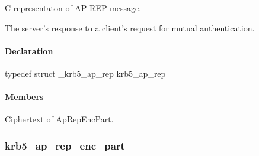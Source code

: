 \documentclass[letterpaper,10pt,english]{sphinxmanual}
\begin{document}
\begin{fulllineitems}
\label{appdev/refs/types/krb5_ap_rep:krb5_ap_rep}
\end{fulllineitems}


C representaton of AP-REP message.

The server's response to a client's request for mutual authentication.


\paragraph{Declaration}
\label{appdev/refs/types/krb5_ap_rep:declaration}
typedef struct \_krb5\_ap\_rep  krb5\_ap\_rep


\paragraph{Members}
\label{appdev/refs/types/krb5_ap_rep:members}

\begin{fulllineitems}
\label{appdev/refs/types/krb5_ap_rep:krb5_ap_rep.magic}
\end{fulllineitems}


\begin{fulllineitems}
\label{appdev/refs/types/krb5_ap_rep:krb5_ap_rep.enc_part}
Ciphertext of ApRepEncPart.

\end{fulllineitems}



\subsubsection{krb5\_ap\_rep\_enc\_part}
\label{appdev/refs/types/krb5_ap_rep_enc_part:krb5-ap-rep-enc-part-struct}\label{appdev/refs/types/krb5_ap_rep_enc_part::doc}\label{appdev/refs/types/krb5_ap_rep_enc_part:krb5-ap-rep-enc-part}

\begin{fulllineitems}
\label{appdev/refs/types/krb5_ap_rep_enc_part:krb5_ap_rep_enc_part}
\end{fulllineitems}
\end{document}
